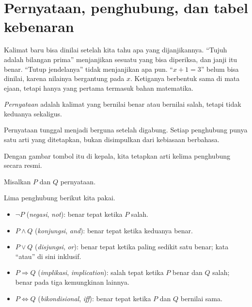 \section{Pernyataan, penghubung, dan tabel kebenaran}

Kalimat baru bisa dinilai setelah kita tahu apa yang dijanjikannya. ``Tujuh adalah
bilangan prima'' menjanjikan sesuatu yang bisa diperiksa, dan janji itu benar. ``Tutup
jendelanya'' tidak menjanjikan apa pun. ``$x+1=3$'' belum bisa dinilai, karena nilainya
bergantung pada $x$. Ketiganya berbentuk sama di mata ejaan, tetapi hanya yang pertama
termasuk bahan matematika.

\begin{definisi}[Pernyataan]
\emph{Pernyataan} adalah kalimat yang bernilai benar atau bernilai salah, tetapi tidak
keduanya sekaligus.
\end{definisi}

Pernyataan tunggal menjadi berguna setelah digabung. Setiap penghubung punya satu arti
yang ditetapkan, bukan disimpulkan dari kebiasaan berbahasa.


Dengan gambar tombol itu di kepala, kita tetapkan arti kelima penghubung secara resmi.

\begin{definisi}
Misalkan $P$ dan $Q$ pernyataan.

Lima penghubung berikut kita pakai.
\begin{itemize}
  \item $\neg P$ (\emph{negasi}, \emph{not}): benar tepat ketika $P$ salah.
  \item $P \wedge Q$ (\emph{konjungsi}, \emph{and}): benar tepat ketika keduanya benar.
  \item $P \vee Q$ (\emph{disjungsi}, \emph{or}): benar tepat ketika paling sedikit
        satu benar; kata ``atau'' di sini inklusif.
  \item $P \Rightarrow Q$ (\emph{implikasi}, \emph{implication}): salah tepat ketika
        $P$ benar dan $Q$ salah; benar pada tiga kemungkinan lainnya.
  \item $P \Leftrightarrow Q$ (\emph{bikondisional}, \emph{iff}): benar tepat ketika
        $P$ dan $Q$ bernilai sama.
\end{itemize}
\end{definisi}

